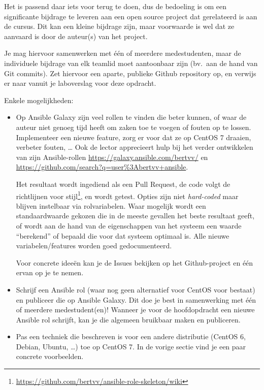 Het is passend daar iets voor terug te doen, dus de bedoeling is om een significante bijdrage te leveren aan een open source project dat gerelateerd is aan de cursus. Dit kan een kleine bijdrage zijn, maar voorwaarde is wel dat ze aanvaard is door de auteur(s) van het project.

Je mag hiervoor samenwerken met één of meerdere medestudenten, maar de individuele bijdrage van elk teamlid moet aantoonbaar zijn (bv.\ aan de hand van Git commits). Zet hiervoor een aparte, publieke Github repository op, en verwijs er naar vanuit je laboverslag voor deze opdracht.

Enkele mogelijkheden:

\begin{itemize}
  \item Op Ansible Galaxy zijn veel rollen te vinden die beter kunnen, of waar de auteur niet genoeg tijd heeft om zaken toe te voegen of fouten op te lossen. Implementeer een nieuwe feature, zorg er voor dat ze op CentOS 7 draaien, verbeter fouten, \ldots{} Ook de lector apprecieert hulp bij het verder ontwikkelen van zijn Ansible-rollen \url{https://galaxy.ansible.com/bertvv/} en \url{https://github.com/search?q=user\%3Abertvv+ansible}.

  Het resultaat wordt ingediend als een Pull Request, de code volgt de richtlijnen voor stijl\footnote{\url{https://github.com/bertvv/ansible-role-skeleton/wiki}}, en wordt getest. Opties zijn niet \emph{hard-coded} maar blijven instelbaar via rolvariabelen. Waar mogelijk wordt een standaardwaarde gekozen die in de meeste gevallen het beste resultaat geeft, of wordt aan de hand van de eigenschappen van het systeem een waarde ``berekend'' of bepaald die voor dat systeem optimaal is. Alle nieuwe variabelen/features worden goed gedocumenteerd.
  
  Voor concrete ideeën kan je de Issues bekijken op het Github-project en één ervan op je te nemen.

  \item Schrijf een Ansible rol (waar nog geen alternatief voor CentOS voor bestaat) en publiceer die op Ansible Galaxy. Dit doe je best in samenwerking met één of meerdere medestudent(en)! Wanneer je voor de hoofdopdracht een nieuwe Ansible rol schrijft, kan je die algemeen bruikbaar maken en publiceren.
  
  \item Pas een techniek die beschreven is voor een andere distributie (CentOS 6, Debian, Ubuntu, \ldots{}) toe op CentOS 7. In de vorige sectie vind je een paar concrete voorbeelden.
\end{itemize}

